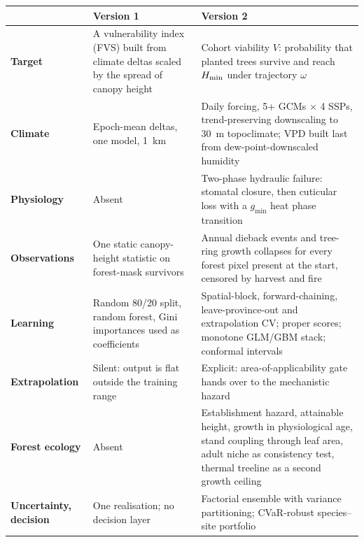 \vspace{2pt}
\begin{keybox}[title={What changes from version 1 to version 2}]
\small
\renewcommand{\arraystretch}{1.14}
\begin{tabularx}{\linewidth}{@{}>{\sffamily\bfseries}p{2.45cm}>{\raggedright\arraybackslash}X>{\raggedright\arraybackslash}X@{}}
 & \textbf{\sffamily Version 1} & \textbf{\sffamily Version 2}\\[1pt]
\hline
Target & A vulnerability index (FVS) built from climate deltas scaled by the spread of canopy height & Cohort viability $V$: probability that planted trees survive and reach $H_{\min}$ under trajectory $\omega$\\
Climate & Epoch-mean deltas, one model, 1~km & Daily forcing, 5+ GCMs $\times$ 4 SSPs, trend-preserving downscaling to 30~m topoclimate; VPD built last from dew-point-downscaled humidity\\
Physiology & Absent & Two-phase hydraulic failure: stomatal closure, then cuticular loss with a $g_{\min}$ heat phase transition\\
Observations & One static canopy-height statistic on forest-mask survivors & Annual dieback events and tree-ring growth collapses for every forest pixel present at the start, censored by harvest and fire\\
Learning & Random 80/20 split, random forest, Gini importances used as coefficients & Spatial-block, forward-chaining, leave-province-out and extrapolation CV; proper scores; monotone GLM/GBM stack; conformal intervals\\
Extrapolation & Silent: output is flat outside the training range & Explicit: area-of-applicability gate hands over to the mechanistic hazard\\
Forest ecology & Absent & Establishment hazard, attainable height, growth in physiological age, stand coupling through leaf area, adult niche as consistency test, thermal treeline as a second growth ceiling\\
Uncertainty, decision & One realisation; no decision layer & Factorial ensemble with variance partitioning; CVaR-robust species--site portfolio\\
\end{tabularx}
\end{keybox}
